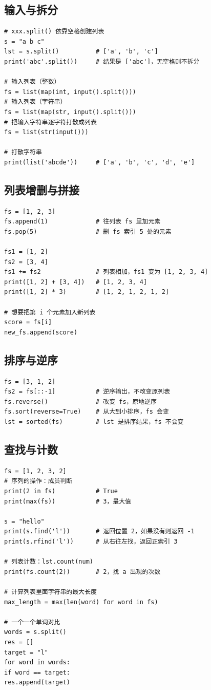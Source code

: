 \documentclass{article}
\begin{document}
\subsection{输入与拆分}
\begin{lstlisting}
# xxx.split() 依靠空格创建列表
s = "a b c"
lst = s.split()          # ['a', 'b', 'c']
print('abc'.split())     # 结果是 ['abc']，无空格则不拆分

# 输入列表（整数）
fs = list(map(int, input().split()))
# 输入列表（字符串）
fs = list(map(str, input().split()))
# 把输入字符串逐字符打散成列表
fs = list(str(input()))

# 打散字符串
print(list('abcde'))     # ['a', 'b', 'c', 'd', 'e']
\end{lstlisting}

\subsection{列表增删与拼接}
\begin{lstlisting}
fs = [1, 2, 3]
fs.append(1)             # 往列表 fs 里加元素
fs.pop(5)                # 删 fs 索引 5 处的元素

fs1 = [1, 2]
fs2 = [3, 4]
fs1 += fs2               # 列表相加，fs1 变为 [1, 2, 3, 4]
print([1, 2] + [3, 4])   # [1, 2, 3, 4]
print([1, 2] * 3)        # [1, 2, 1, 2, 1, 2]

# 想要把第 i 个元素加入新列表
score = fs[i]
new_fs.append(score)
\end{lstlisting}

\subsection{排序与逆序}
\begin{lstlisting}
fs = [3, 1, 2]
fs2 = fs[::-1]           # 逆序输出，不改变原列表
fs.reverse()             # 改变 fs，原地逆序
fs.sort(reverse=True)    # 从大到小排序，fs 会变
lst = sorted(fs)         # lst 是排序结果，fs 不会变
\end{lstlisting}

\subsection{查找与计数}
\begin{lstlisting}
fs = [1, 2, 3, 2]
# 序列的操作：成员判断
print(2 in fs)           # True
print(max(fs))           # 3，最大值

s = "hello"
print(s.find('l'))       # 返回位置 2，如果没有则返回 -1
print(s.rfind('l'))      # 从右往左找，返回正索引 3

# 列表计数：lst.count(num)
print(fs.count(2))       # 2，找 a 出现的次数

# 计算列表里面字符串的最大长度
max_length = max(len(word) for word in fs)

# 一个一个单词对比
words = s.split()
res = []
target = "l"
for word in words:
if word == target:
res.append(target)
\end{lstlisting}
\end{document}
